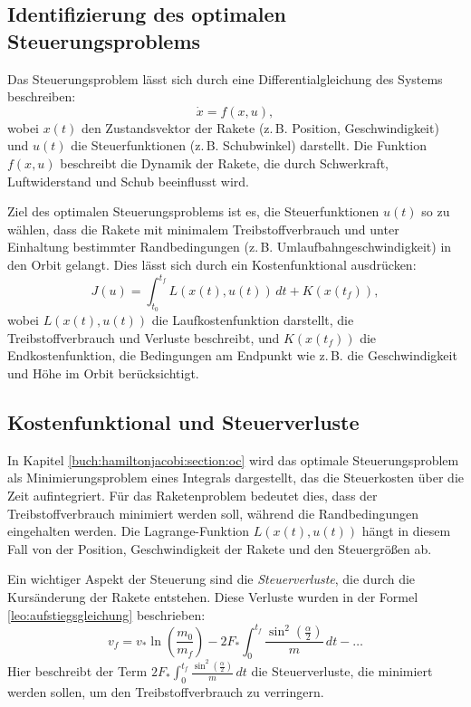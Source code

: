 \subsection{Identifizierung des optimalen Steuerungsproblems}

Das Steuerungsproblem lässt sich durch eine Differentialgleichung des Systems beschreiben:
\[
\dot{x} = f(x,u),
\]
wobei \(x(t)\) den Zustandsvektor der Rakete (z.\,B. Position, Geschwindigkeit) und \(u(t)\) die Steuerfunktionen (z.\,B. Schubwinkel) darstellt. 
Die Funktion \(f(x,u)\) beschreibt die Dynamik der Rakete, die durch Schwerkraft, Luftwiderstand und Schub beeinflusst wird.

Ziel des optimalen Steuerungsproblems ist es, die Steuerfunktionen \(u(t)\) so zu wählen, dass die Rakete mit minimalem Treibstoffverbrauch und unter Einhaltung bestimmter Randbedingungen (z.\,B. Umlaufbahngeschwindigkeit) in den Orbit gelangt. 
Dies lässt sich durch ein Kostenfunktional ausdrücken:
\[
J(u) = \int_{t_0}^{t_f} L(x(t), u(t))\, dt + K(x(t_f)),
\]
wobei \(L(x(t), u(t))\) die Laufkostenfunktion darstellt, die Treibstoffverbrauch und Verluste beschreibt, und \(K(x(t_f))\) die Endkostenfunktion, die Bedingungen am Endpunkt wie z.\,B. die Geschwindigkeit und Höhe im Orbit berücksichtigt.

\subsection{Kostenfunktional und Steuerverluste}

In Kapitel \ref{buch:hamiltonjacobi:section:oc} wird das optimale Steuerungsproblem als Minimierungsproblem eines Integrals dargestellt, das die Steuerkosten über die Zeit aufintegriert. 
Für das Raketenproblem bedeutet dies, dass der Treibstoffverbrauch minimiert werden soll, während die Randbedingungen eingehalten werden. 
Die Lagrange-Funktion \(L(x(t), u(t))\) hängt in diesem Fall von der Position, Geschwindigkeit der Rakete und den Steuergrößen ab.

Ein wichtiger Aspekt der Steuerung sind die \textit{Steuerverluste}, die durch die Kursänderung der Rakete entstehen. Diese Verluste wurden in der Formel \eqref{leo:aufstiegsgleichung} beschrieben:
\[
v_f = v_* \ln \left(\frac{m_0}{m_f}\right) - 2F_* \int_0^{t_f} \frac{\sin^2\left(\frac{\alpha}{2}\right)}{m} \, dt - \dots
\]
Hier beschreibt der Term \(2F_* \int_0^{t_f} \frac{\sin^2\left(\frac{\alpha}{2}\right)}{m} \, dt\) die Steuerverluste, die minimiert werden sollen, um den Treibstoffverbrauch zu verringern.


